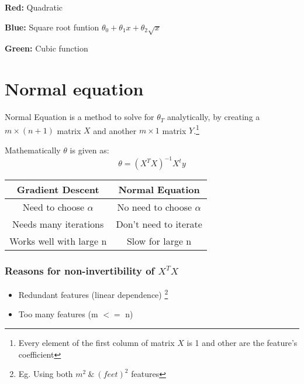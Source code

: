     \textbf{Red:} Quadratic

    \textbf {Blue:} Square root funtion $ \theta_0+\theta_1x+\theta_2\sqrt{x} $

    \textbf {Green:} Cubic function

\section{Normal equation}
  Normal Equation is a method to solve for $\theta_T$ analytically, by creating a $m\times(n+1)$ matrix $X$ and another $m\times1$ matrix $Y$.\footnote[2]{Every element of the first column of matrix $X$ is 1 and other are the feature's coefficient}

  Mathematically $\theta$ is given as:
  \begin{equation} \label {eq: theta}
    \theta = (X^TX)^{-1}X^ty
  \end{equation}

  \begin{tabular}{ |c|c|}
    \hline
    \textbf{Gradient Descent} & \textbf{Normal Equation} \\
    \hline
    Need to choose $\alpha$ & No need to choose $\alpha$ \\
    Needs many iterations & Don't need to iterate \\
    Works well with large n & Slow for large n \\
    \hline
  \end{tabular}

  \vspace{5mm}

  \subsubsection{Reasons for non-invertibility of $X^T X$}
    \begin{itemize}
      \item Redundant features (linear dependence) \footnote[3]{Eg. Using both $m^2 \  \& \  (feet)^2$ features}
      \item Too many features (m $<=$ n) 
    \end{itemize}
  
